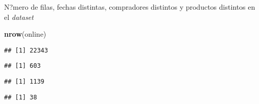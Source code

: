 \documentclass[
  ignorenonframetext,
]{beamer}
\newenvironment{Shaded}{\begin{snugshade}}{\end{snugshade}}
\newcommand{\KeywordTok}[1]{\textcolor[rgb]{0.13,0.29,0.53}{\textbf{#1}}}
\newcommand{\NormalTok}[1]{#1}
\newcommand{\OperatorTok}[1]{\textcolor[rgb]{0.81,0.36,0.00}{\textbf{#1}}}
\begin{document}
\begin{frame}[fragile]{N?mero de filas, fechas distintas, compradores
distintos y productos distintos en el \emph{dataset}}
\protect\hypertarget{nmero-de-filas-fechas-distintas-compradores-distintos-y-productos-distintos-en-el-dataset}{}

\begin{Shaded}
\begin{Highlighting}[]
\KeywordTok{nrow}\NormalTok{(online)}
\end{Highlighting}
\end{Shaded}

\begin{verbatim}
## [1] 22343
\end{verbatim}

\begin{Shaded}
\end{Shaded}

\begin{verbatim}
## [1] 603
\end{verbatim}

\begin{Shaded}
\end{Shaded}

\begin{verbatim}
## [1] 1139
\end{verbatim}

\begin{Shaded}
\end{Shaded}

\begin{verbatim}
## [1] 38
\end{verbatim}

\end{frame}
\end{document}
